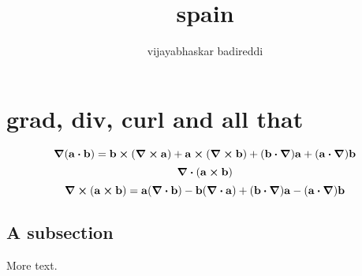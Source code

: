 \documentclass[12pt]{article}
\title{spain}
\author{vijayabhaskar badireddi}
\begin{document}
    
\section*{grad, div, curl and all that}

\[\grad{\qty(\vb{a}\vdot\vb{b})}=\vb{b}\cp\qty(\curl{\vb{a}})+\vb{a}\cp\qty(\curl{\vb{b}})+\qty(\vb{b}\vdot\grad)\vb{a}+\qty(\vb{a}\vdot\grad)\vb{b}\]    
\[\div{\qty(\vb{a}\cp\vb{b})}\]
\[\curl{\qty(\vb{a}\cp\vb{b})}=\vb{a}\qty(\div{\vb{b}})-\vb{b}\qty(\div{\vb{a}})+\qty(\vb{b}\vdot\grad)\vb{a}-\qty(\vb{a}\vdot\grad)\vb{b}\]
    
\subsection*{A subsection}
    
More text.
    
\end{document}
